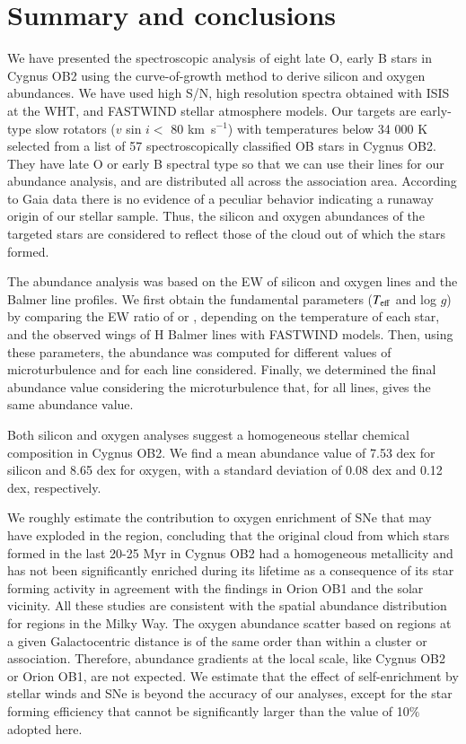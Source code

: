 \documentclass{aa} %
\begin{document}
\section{Summary and conclusions}\label{sect5}

We have presented the spectroscopic analysis of eight late O, early B stars in Cygnus OB2 using the curve-of-growth method to derive silicon and oxygen abundances. We have used high S/N, high resolution spectra obtained with ISIS at the WHT, and FASTWIND stellar atmosphere models.
Our targets are early-type slow rotators ($v$ sin $i <$ 80 km~s$^{-1}$) with temperatures below 34 000 K selected from a list of 57 spectroscopically classified OB stars in Cygnus OB2. They have late O or early B spectral type so that we can use their  lines for our abundance analysis, and are distributed all across the association area. According to Gaia data there is no evidence of a peculiar behavior indicating a runaway origin of our stellar sample. Thus, the silicon and oxygen abundances of the targeted stars are considered to reflect those of the cloud out of which the stars formed.

The abundance analysis was based on the EW of silicon and oxygen lines and the Balmer line profiles. We first obtain the fundamental parameters ($T_{\rm eff}$ and log $g$) by comparing the EW ratio of  or , depending on the temperature of each star, and the observed wings of H Balmer lines with FASTWIND models. Then, using these parameters,  the  abundance was computed for different values of microturbulence and for each line considered. Finally, we determined the final abundance value considering the microturbulence that, for all lines, gives the same abundance value. 


Both silicon and oxygen analyses suggest a homogeneous stellar chemical  composition in Cygnus OB2. We find a mean abundance value of 7.53 dex for silicon and 8.65 dex for oxygen, with a standard deviation of 0.08 dex and 0.12 dex, respectively.

We roughly estimate the contribution to oxygen enrichment of SNe that may have exploded in the region, concluding that the original cloud from which stars formed in the last 20-25 Myr in Cygnus OB2  
had a homogeneous metallicity and has not been significantly enriched during its lifetime as a consequence of its star forming activity in agreement with the findings in Orion OB1 and the solar vicinity. All these studies are consistent with the spatial abundance distribution for  regions in the Milky Way. The oxygen abundance scatter based on  regions at a given Galactocentric distance is of the same order than within a cluster or association. Therefore, abundance gradients at the local scale, like Cygnus OB2 or Orion OB1, are not expected. We estimate that the effect of self-enrichment by stellar winds and SNe is beyond the accuracy of our analyses, except for the star forming efficiency that cannot be significantly larger than the value of 10$\%$ adopted here. 
\end{document}
